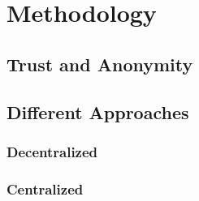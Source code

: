 
\chapter{Methodology}\label{chapter:methodology}
\section{Trust and Anonymity}
\section{Different Approaches}
\subsection{Decentralized}
\subsection{Centralized}

